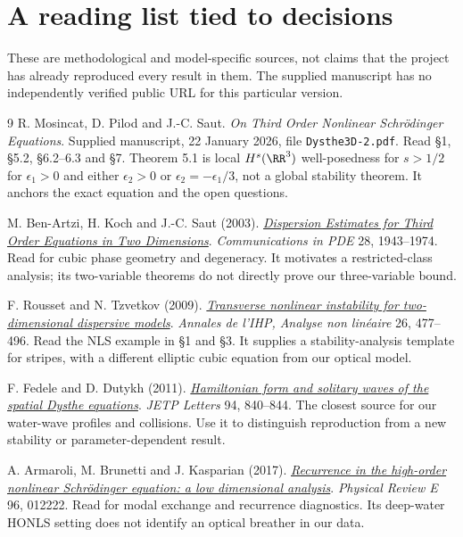 \documentclass[11pt]{article}
\begin{document}
\section{A reading list tied to decisions}
These are methodological and model-specific sources, not claims that the project has already reproduced every result in them. The supplied manuscript has no independently verified public URL for this particular version.
\begin{thebibliography}{9}
\setlength{\itemsep}{.55em}
 R. Mosincat, D. Pilod and J.-C. Saut.
\emph{On Third Order Nonlinear Schr\"odinger Equations}. Supplied manuscript, 22 January 2026, file \texttt{Dysthe3D-2.pdf}.
Read \S1, \S5.2, \S6.2--6.3 and \S7. Theorem 5.1 is local $H^s(\RR^3)$ well-posedness for $s>1/2$ for $\epsilon_1>0$ and either $\epsilon_2>0$ or $\epsilon_2=-\epsilon_1/3$, not a global stability theorem. It anchors the exact equation and the open questions.

 M. Ben-Artzi, H. Koch and J.-C. Saut (2003).
\href{https://math.huji.ac.il/~mbartzi/recent-publications/120025491_PDE_028_011-012_R1.pdf}{\emph{Dispersion Estimates for Third Order Equations in Two Dimensions}}.
\emph{Communications in PDE} 28, 1943--1974.
Read for cubic phase geometry and degeneracy. It motivates a restricted-class analysis; its two-variable theorems do not directly prove our three-variable bound.

 F. Rousset and N. Tzvetkov (2009).
\href{https://arxiv.org/abs/math/0612494}{\emph{Transverse nonlinear instability for two-dimensional dispersive models}}.
\emph{Annales de l'IHP, Analyse non lin\'eaire} 26, 477--496.
Read the NLS example in \S1 and \S3. It supplies a stability-analysis template for stripes, with a different elliptic cubic equation from our optical model.

 F. Fedele and D. Dutykh (2011).
\href{https://arxiv.org/abs/1110.4083}{\emph{Hamiltonian form and solitary waves of the spatial Dysthe equations}}.
\emph{JETP Letters} 94, 840--844.
The closest source for our water-wave profiles and collisions. Use it to distinguish reproduction from a new stability or parameter-dependent result.

 A. Armaroli, M. Brunetti and J. Kasparian (2017).
\href{https://arxiv.org/abs/1703.09482}{\emph{Recurrence in the high-order nonlinear Schr\"odinger equation: a low dimensional analysis}}.
\emph{Physical Review E} 96, 012222.
Read for modal exchange and recurrence diagnostics. Its deep-water HONLS setting does not identify an optical breather in our data.


\end{thebibliography}
\end{document}
